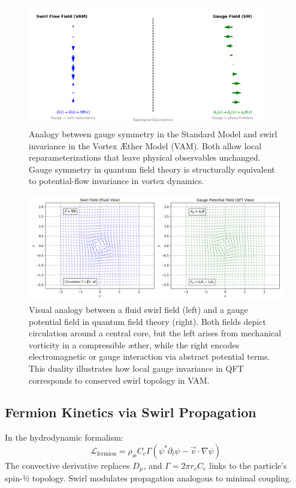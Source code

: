 \begin{figure}[H]
    \centering
    \includegraphics[width=0.95\textwidth]{images/gauge_swirl_equivalence}
    \caption{Analogy between gauge symmetry in the Standard Model and swirl invariance in the Vortex Æther Model (VAM). Both allow local reparameterizations that leave physical observables unchanged. Gauge symmetry in quantum field theory is structurally equivalent to potential-flow invariance in vortex dynamics.}
    \label{fig:gauge_swirl_equivalence}
\end{figure}

\begin{figure}[H]
    \centering
    \includegraphics[width=0.9\linewidth]{images/SwirlVSGauge}
    \caption{
        Visual analogy between a fluid swirl field (left) and a gauge potential field in quantum field theory (right).
        Both fields depict circulation around a central core, but the left arises from mechanical vorticity in a compressible æther,
        while the right encodes electromagnetic or gauge interaction via abstract potential terms.
        This duality illustrates how local gauge invariance in QFT corresponds to conserved swirl topology in VAM.
    }
    \label{fig:swirl_gauge_analogy}
\end{figure}

\subsection{Fermion Kinetics via Swirl Propagation}
In the hydrodynamic formalism:
\begin{equation}
    \mathcal{L}_{\text{fermion}} = \rho_\text{\ae} C_e \Gamma \left( \psi^* \partial_t \psi - \vec{v} \cdot \nabla \psi \right)
\end{equation}
The convective derivative replaces $D_\mu$, and $\Gamma = 2\pi r_c C_e$ links to the particle’s spin-½ topology. Swirl modulates propagation analogous to minimal coupling.

